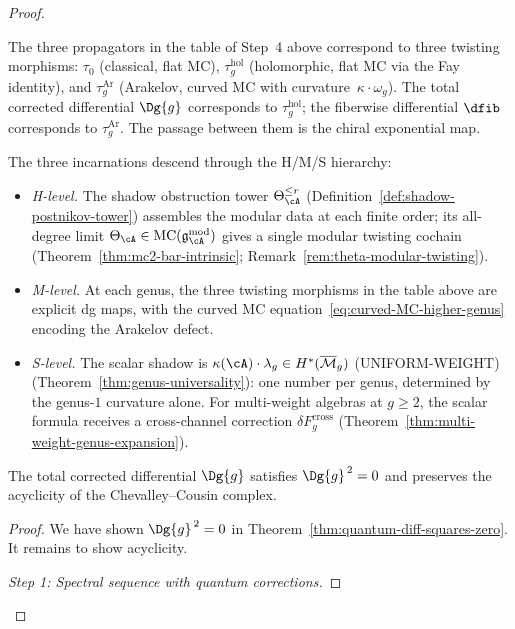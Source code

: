 \begin{proof}
\begin{remark}
The three propagators in the table of Step~4 above correspond
to three twisting morphisms: $\tau_0$ (classical, flat MC),
$\tau_g^{\mathrm{hol}}$ (holomorphic, flat MC via the Fay
identity), and $\tau_g^{\mathrm{Ar}}$ (Arakelov, curved MC
with curvature~$\kappa \cdot \omega_g$).
The total corrected differential $\Dg{g}$ corresponds to
$\tau_g^{\mathrm{hol}}$; the fiberwise differential $\dfib$
corresponds to $\tau_g^{\mathrm{Ar}}$.
The passage between them is the chiral exponential map.

The three incarnations descend through the H/M/S hierarchy:
\begin{itemize}
\item \emph{H-level.} The shadow obstruction tower
 $\Theta_\cA^{\leq r}$
 (Definition~\ref{def:shadow-postnikov-tower})
 assembles the modular data at each finite order;
 its all-degree limit
 $\Theta_\cA \in
 \mathrm{MC}(\mathfrak{g}_\cA^{\mathrm{mod}})$
 gives a single modular twisting cochain
 (Theorem~\ref{thm:mc2-bar-intrinsic};
 Remark~\ref{rem:theta-modular-twisting}).
\item \emph{M-level.} At each genus, the three twisting
 morphisms in the table above are explicit dg maps,
 with the curved MC equation~\eqref{eq:curved-MC-higher-genus}
 encoding the Arakelov defect.
\item \emph{S-level.} The scalar shadow is
 $\kappa(\cA) \cdot \lambda_g \in H^*(\overline{\mathcal{M}}_g)$
 \textup{(}UNIFORM-WEIGHT\textup{)}
 (Theorem~\ref{thm:genus-universality}):
 one number per genus,
 determined by the genus-$1$ curvature alone.
 For multi-weight algebras at $g \geq 2$, the scalar formula
 receives a cross-channel correction $\delta F_g^{\mathrm{cross}}$
 (Theorem~\ref{thm:multi-weight-genus-expansion}).
\end{itemize}
\end{remark}

\begin{lemma}\label{lem:quantum-preserves-acyclicity}
The total corrected differential $\Dg{g}$ satisfies $\Dg{g}^{\,2} = 0$ and preserves the
acyclicity of the Chevalley--Cousin complex.
\end{lemma}

\begin{proof}
We have shown $\Dg{g}^{\,2} = 0$ in Theorem~\ref{thm:quantum-diff-squares-zero}. It remains to show acyclicity.

\emph{Step 1: Spectral sequence with quantum corrections.}


\end{proof}
\end{proof}
